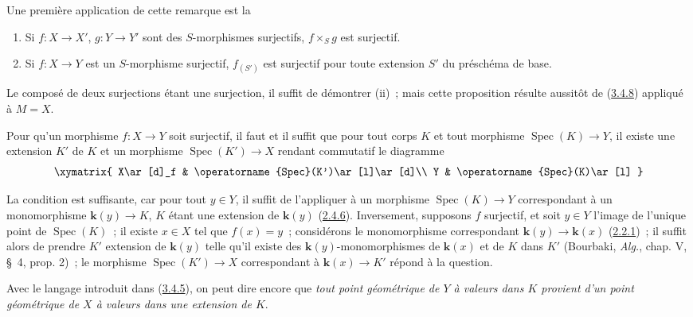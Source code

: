 Une première application de cette remarque est la

\begin{proposition}[3.5.2]
\label{I.3.5.2-fr}
\begin{enumerate}
  \item[(i)] Si $f:X\to X'$, $g:Y\to Y'$ sont des $S$-morphismes surjectifs,
  $f\times_S g$ est surjectif.
  \item[(ii)] Si $f:X\to Y$ est un $S$-morphisme surjectif, $f_{(S')}$ est
  surjectif pour toute extension $S'$ du préschéma de base.
\end{enumerate}
\end{proposition}

Le composé de deux surjections étant une surjection, il suffit de démontrer
(ii)~; mais cette proposition résulte aussitôt de
(\hyperref[I.3.4.8-fr]{3.4.8}) appliqué à $M=X$.

\begin{proposition}[3.5.3]
\label{I.3.5.3-fr}
Pour qu'un morphisme $f:X\to Y$ soit surjectif, il faut et il suffit que pour
tout corps $K$ et tout morphisme $\operatorname{Spec}(K)\to Y$, il existe une
extension $K'$ de $K$ et un morphisme $\operatorname{Spec}(K')\to X$ rendant
commutatif le diagramme
\label{I.3.5.3.surjectivity-diagram-fr}
\[
  \xymatrix{
    X\ar[d]_f & \operatorname{Spec}(K')\ar[l]\ar[d]\\
    Y & \operatorname{Spec}(K)\ar[l]
  }
\]
\end{proposition}

La condition est suffisante, car pour tout $y\in Y$, il suffit de l'appliquer
à un morphisme $\operatorname{Spec}(K)\to Y$ correspondant à un monomorphisme
$\boldsymbol{k}(y)\to K$, $K$ étant une extension de $\boldsymbol{k}(y)$
(\hyperref[I.2.4.6-fr]{2.4.6}). Inversement, supposons $f$ surjectif, et soit
$y\in Y$ l'image de l'unique point de $\operatorname{Spec}(K)$~; il existe
$x\in X$ tel que $f(x)=y$~; considérons le monomorphisme correspondant
$\boldsymbol{k}(y)\to\boldsymbol{k}(x)$ (\hyperref[I.2.2.1-fr]{2.2.1})~; il suffit alors de prendre
$K'$ extension de $\boldsymbol{k}(y)$ telle qu'il existe des $\boldsymbol{k}(y)$-monomorphismes de
$\boldsymbol{k}(x)$ et de $K$ dans $K'$ (Bourbaki, \emph{Alg.}, chap. V, \S~4, prop. 2)~;
le morphisme $\operatorname{Spec}(K')\to X$ correspondant à $\boldsymbol{k}(x)\to K'$
répond à la question.

Avec le langage introduit dans (\hyperref[I.3.4.5-fr]{3.4.5}), on peut dire
encore que \emph{tout point géométrique de $Y$ à valeurs dans $K$ provient
d'un point géométrique de $X$ à valeurs dans une extension de $K$}.


